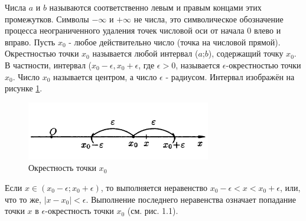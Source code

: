 Числа $a$ и $b$ называются соответственно левым и правым концами этих промежутков. Символы $-\infty$ и $+\infty$ не числа, это символическое обозначение процесса неограниченного удаления точек числовой оси от начала 0 влево и вправо.
Пусть $x_0$ - любое действительно число (точка на числовой прямой). Окрестностью точки $x_0$ называется любой интервал ($a$;$b$), содержащий точку $x_0$. В частности, интервал ($x_0-\epsilon, x_0+\epsilon$, где $\epsilon>0$, называется $\epsilon$-окрестностью точки $x_0$. Число $x_0$ называется центром, а число $\epsilon$ - радиусом. Интервал изображён на рисунке \ref{Окрестность}.
\begin{figure}[H]
	\centerline{\includegraphics[width=0.5\linewidth]{1.png}}
	\caption{Окрестность точки $x_0$}
	\label{Окрестность}
\end{figure}
Если $x \in (x_0-\epsilon; x_0+\epsilon)$, то выполняется неравенство $x_0-\epsilon<x<x_0+\epsilon$, или, что то же, $|x-x_0|<\epsilon$. Выполнение последнего неравенства означает попадание точки $x$ в $\epsilon$-окрестность точки $x_0$ (см. рис. 1.1).


